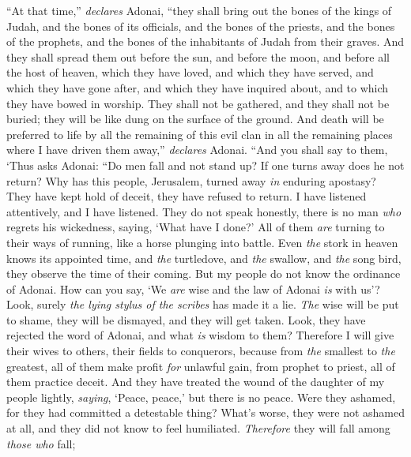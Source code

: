 \begin{biblechapter} %
\verse “At that time,” \textit{declares} Adonai, “they shall bring out the bones of the kings of Judah, and the bones of its officials, and the bones of the priests, and the bones of the prophets, and the bones of the inhabitants of Judah from their graves.
\verse And they shall spread them out before the sun, and before the moon, and before all the host of heaven, which they have loved, and which they have served, and which they have gone after, and which they have inquired about, and to which they have bowed in worship. They shall not be gathered, and they shall not be buried; they will be like dung on the surface of the ground.
\verse And death will be preferred to life by all the remaining of this evil clan in all the remaining places where I have driven them away,” \textit{declares} Adonai.
 “And you shall say to them, ‘Thus asks Adonai:
\verse “Do men fall and not stand up? 
If one turns away does he not return?
\verse Why has this people, Jerusalem, turned away \textit{in} enduring apostasy? 
They have kept hold of deceit, they have refused to return.
\verse I have listened attentively, 
and I have listened. 
They do not speak honestly, 
there is no man \textit{who} regrets his wickedness, saying, ‘What have I done?’ 
All of them \textit{are} turning to their ways of running, 
like a horse plunging into battle.
\verse Even \textit{the} stork in heaven knows its appointed time, 
and \textit{the} turtledove, and \textit{the} swallow, and \textit{the} song bird, 
they observe the time of their coming. 
But my people do not know the ordinance of Adonai.
\verse How can you say, ‘We \textit{are} wise and the law of Adonai \textit{is} with us’? 
Look, surely \textit{the lying stylus of the scribes} has made it a lie.
\verse \textit{The} wise will be put to shame, 
they will be dismayed, 
and they will get taken. 
Look, they have rejected the word of Adonai, 
and what \textit{is} wisdom to them?
\verse Therefore I will give their wives to others, 
their fields to conquerors, 
because from \textit{the} smallest to \textit{the} greatest, 
all of them make profit \textit{for} unlawful gain, 
from prophet to priest, 
all of them practice deceit.
\verse And they have treated the wound of the daughter of my people lightly, 
\textit{saying}, ‘Peace, peace,’ but there is no peace.
\verse Were they ashamed, for they had committed a detestable thing? 
What’s worse, they were not ashamed at all, 
and they did not know to feel humiliated. 
\textit{Therefore} they will fall among \textit{those who} fall; 

\end{biblechapter}

